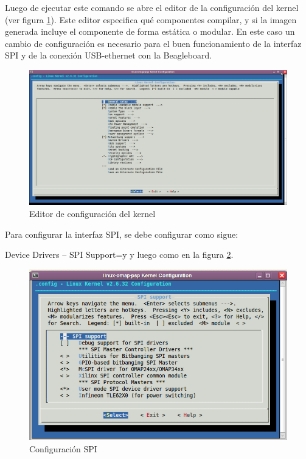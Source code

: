 \bigskip
Luego de ejecutar este comando se abre el editor de la configuración del kernel (ver figura \ref{Fig:kernel}). Este editor especifica qué componentes compilar, y si la imagen generada incluye el componente de forma estática o modular. En este caso un cambio de  configuración es necesario para el buen funcionamiento de la interfaz SPI y de la conexión USB-ethernet con la Beagleboard.

\begin{figure}[H]
\centering
  \begin{center}
  \includegraphics[scale=.3]{Imagenes/kernel.png} 
  \end{center}
  \caption{Editor de configuración del kernel}\label{Fig:kernel} 
\end{figure}

Para configurar la interfaz SPI, se debe configurar como sigue:

Device Drivers – SPI Support=y y luego como en la figura \ref{Fig:spi}.

\begin{figure}[H]
\centering
  \begin{center}
  \includegraphics[scale=.4]{Imagenes/spi_chica.png} 
  \end{center}
  \caption{Configuración SPI}\label{Fig:spi} 
\end{figure}

